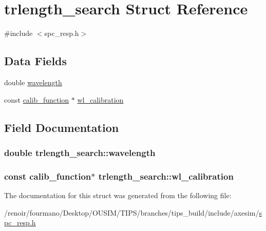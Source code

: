 \hypertarget{structtrlength__search}{
\section{trlength\_\-search Struct Reference}
\label{structtrlength__search}
}


{\ttfamily \#include $<$spc\_\-resp.h$>$}\subsection*{Data Fields}
\begin{DoxyCompactItemize}
\item 
double \hyperlink{structtrlength__search_a745f8eade655538209b55f0aa6c68f91}{wavelength}
\item 
const \hyperlink{structcalib__function}{calib\_\-function} $\ast$ \hyperlink{structtrlength__search_a970eb5524953dfc84f84db744ed64c35}{wl\_\-calibration}
\end{DoxyCompactItemize}


\subsection{Field Documentation}
\hypertarget{structtrlength__search_a745f8eade655538209b55f0aa6c68f91}{
\subsubsection[{wavelength}]{\setlength{\rightskip}{0pt plus 5cm}double {\bf trlength\_\-search::wavelength}}}
\label{structtrlength__search_a745f8eade655538209b55f0aa6c68f91}
\hypertarget{structtrlength__search_a970eb5524953dfc84f84db744ed64c35}{
\subsubsection[{wl\_\-calibration}]{\setlength{\rightskip}{0pt plus 5cm}const {\bf calib\_\-function}$\ast$ {\bf trlength\_\-search::wl\_\-calibration}}}
\label{structtrlength__search_a970eb5524953dfc84f84db744ed64c35}


The documentation for this struct was generated from the following file:\begin{DoxyCompactItemize}
\item 
/renoir/fourmano/Desktop/OUSIM/TIPS/branches/tips\_\-build/include/axesim/\hyperlink{spc__resp_8h}{spc\_\-resp.h}\end{DoxyCompactItemize}
